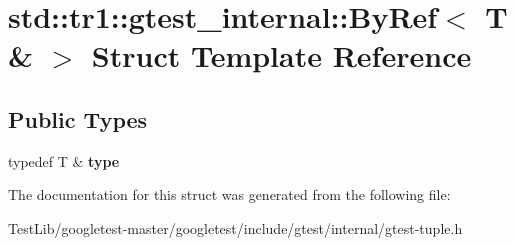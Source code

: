 \hypertarget{structstd_1_1tr1_1_1gtest__internal_1_1ByRef_3_01T_01_6_01_4}{}\section{std\+:\+:tr1\+:\+:gtest\+\_\+internal\+:\+:By\+Ref$<$ T \& $>$ Struct Template Reference}
\label{structstd_1_1tr1_1_1gtest__internal_1_1ByRef_3_01T_01_6_01_4}
\subsection*{Public Types}
\begin{DoxyCompactItemize}
\item 
\mbox{\label{structstd_1_1tr1_1_1gtest__internal_1_1ByRef_3_01T_01_6_01_4_a512382574dbdd736320d68e313801122}} 
typedef T \& {\bfseries type}
\end{DoxyCompactItemize}


The documentation for this struct was generated from the following file\+:\begin{DoxyCompactItemize}
\item 
Test\+Lib/googletest-\/master/googletest/include/gtest/internal/gtest-\/tuple.\+h\end{DoxyCompactItemize}

